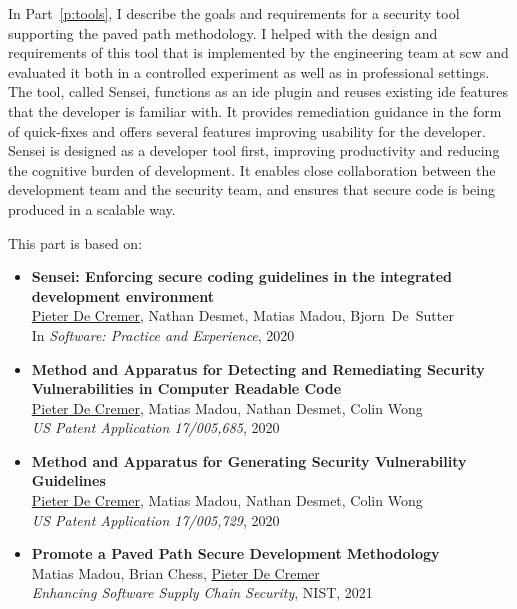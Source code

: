 In Part~\ref{p:tools}, I describe the goals and requirements for a security tool supporting the paved path methodology.
I helped with the design and requirements of this tool that is implemented by the engineering team at \gls{scw} and evaluated it both in a controlled experiment as well as in professional settings.
The tool, called Sensei, functions as an \gls{ide} plugin and reuses existing \gls{ide} features that the developer is familiar with.
It provides remediation guidance in the form of quick-fixes and offers several features improving usability for the developer.
Sensei is designed as a developer tool first, improving productivity and reducing the cognitive burden of development.
It enables close collaboration between the development team and the security team, and ensures that secure code is being produced in a scalable way.

This part is based on:

\begin{itemize}
 \item 
 \textbf{Sensei: Enforcing secure coding guidelines in the integrated development environment}\\
 {\small \underline{Pieter De Cremer}, Nathan Desmet, Matias Madou, \mbox{Bjorn De Sutter}\\}
 In \emph{Software: Practice and Experience}, 2020
    
 \item 
 \textbf{Method and Apparatus for Detecting and Remediating Security Vulnerabilities in Computer Readable Code}\\
 \underline{Pieter De Cremer}, Matias Madou, Nathan Desmet, Colin Wong\\
 \emph{US Patent Application 17/005,685}, 2020
 
 \item 
 \textbf{Method and Apparatus for Generating Security Vulnerability Guidelines}\\
 \underline{Pieter De Cremer}, Matias Madou, Nathan Desmet, Colin Wong\\
 \emph{US Patent Application 17/005,729}, 2020
 
 \item 
 \textbf{Promote a Paved Path Secure Development Methodology}\\
 Matias Madou, Brian Chess, \underline{Pieter De Cremer}\\
 \emph{Enhancing Software Supply Chain Security}, NIST, 2021
\end{itemize}

